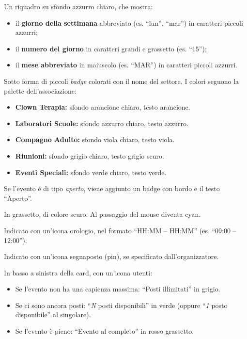 \documentclass[a4paper,11pt,oneside]{book}
\begin{document}
\begin{description}[leftmargin=1.5em, style=nextline]
  \item[Blocco data] Un riquadro su sfondo azzurro chiaro, che mostra:
    \begin{itemize}
      \item il \textbf{giorno della settimana} abbreviato (es. ``lun'', ``mar'') in caratteri piccoli azzurri;
      \item il \textbf{numero del giorno} in caratteri grandi e grassetto (es. ``15'');
      \item il \textbf{mese abbreviato} in maiuscolo (es. ``MAR'') in caratteri piccoli azzurri.
    \end{itemize}

  \item[Settori] Sotto forma di piccoli \textit{badge} colorati con il nome del settore. I colori seguono la palette dell'associazione:
    \begin{itemize}
      \item \textbf{Clown Terapia:} sfondo arancione chiaro, testo arancione.
      \item \textbf{Laboratori Scuole:} sfondo azzurro chiaro, testo azzurro.
      \item \textbf{Compagno Adulto:} sfondo viola chiaro, testo viola.
      \item \textbf{Riunioni:} sfondo grigio chiaro, testo grigio scuro.
      \item \textbf{Eventi Speciali:} sfondo verde chiaro, testo verde.
    \end{itemize}
    Se l'evento \`e di tipo \textit{aperto}, viene aggiunto un badge con bordo e il testo ``Aperto''.

  \item[Titolo] In grassetto, di colore scuro. Al passaggio del mouse diventa \textcolor{namoCyan}{cyan}.

  \item[Orario] Indicato con un'icona orologio, nel formato ``HH:MM -- HH:MM'' (es. ``09:00 -- 12:00'').

  \item[Luogo] Indicato con un'icona segnaposto (pin), se specificato dall'organizzatore.

  \item[Posti disponibili] In basso a sinistra della card, con un'icona utenti:
    \begin{itemize}
      \item Se l'evento non ha una capienza massima: ``Posti illimitati'' in grigio.
      \item Se ci sono ancora posti: ``\textit{N} posti disponibili'' in \textcolor{namoGreen}{verde} (oppure ``\textit{1} posto disponibile'' al singolare).
      \item Se l'evento \`e pieno: ``Evento al completo'' in \textcolor{namoRed}{rosso} grassetto.
    \end{itemize}


\end{description}
\end{document}
